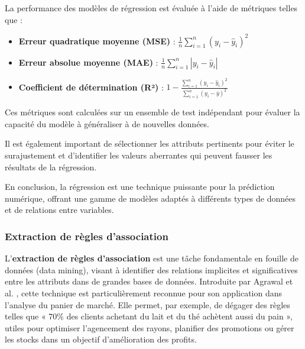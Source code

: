 \documentclass[a4paper,12pt]{article}
\begin{document}

La performance des modèles de régression est évaluée à l’aide de métriques telles que :

\begin{itemize}
    \item \textbf{Erreur quadratique moyenne (MSE)} : \(\frac{1}{n} \sum_{i=1}^n (y_i - \hat{y}_i)^2\)
    \item \textbf{Erreur absolue moyenne (MAE)} : \(\frac{1}{n} \sum_{i=1}^n |y_i - \hat{y}_i|\)
    \item \textbf{Coefficient de détermination (R²)} : \(1 - \frac{\sum_{i=1}^n (y_i - \hat{y}_i)^2}{\sum_{i=1}^n (y_i - \bar{y})^2}\)
\end{itemize}

Ces métriques sont calculées sur un ensemble de test indépendant pour évaluer la capacité du modèle à généraliser à de nouvelles données.

Il est également important de sélectionner les attributs pertinents pour éviter le surajustement et d’identifier les valeurs aberrantes qui peuvent fausser les résultats de la régression.

En conclusion, la régression est une technique puissante pour la prédiction numérique, offrant une gamme de modèles adaptés à différents types de données et de relations entre variables.  

        \subsubsection{Extraction de règles d’association}
        
        L'\textbf{extraction de règles d’association} est une tâche fondamentale en fouille de données (data mining), visant à identifier des relations implicites et significatives entre les attributs dans de grandes bases de données. Introduite par Agrawal et al. , cette technique est particulièrement reconnue pour son application dans l’analyse du panier de marché. Elle permet, par exemple, de dégager des règles telles que « 70\% des clients achetant du lait et du thé achètent aussi du pain », utiles pour optimiser l’agencement des rayons, planifier des promotions ou gérer les stocks dans un objectif d’amélioration des profits.
        
\end{document}
